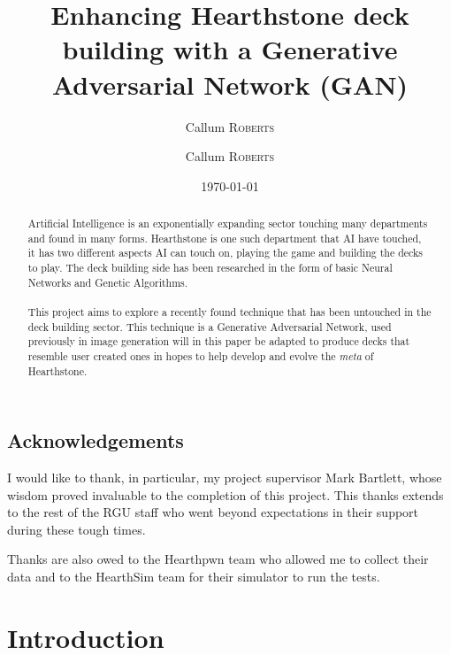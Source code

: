 \documentclass{report} %
\title{Enhancing Hearthstone deck building with a Generative Adversarial Network (GAN)} %
\author{Callum \textsc{Roberts}} %
\author{Callum \textsc{Roberts}} %
\date{\today} %
\begin{document}
\maketitle %


\begin{abstract}
Artificial Intelligence is an exponentially expanding sector touching many departments and found in many forms. Hearthstone is one such department that AI have touched, it has two different aspects AI can touch on, playing the game and building the decks to play. The deck building side has been researched in the form of basic Neural Networks and Genetic Algorithms. \\
\\
This project aims to explore a recently found technique that has been untouched in the deck building sector. This technique is a Generative Adversarial Network, used previously in image generation will in this paper be adapted to produce decks that resemble user created ones in hopes to help develop and evolve the \textit{meta} of Hearthstone.

\end{abstract}

\section*{Acknowledgements}
I would like to thank, in particular, my project supervisor Mark Bartlett, whose wisdom proved invaluable to the completion of this project. This thanks extends to the rest of the RGU staff who went beyond expectations in their support during these tough times.

Thanks are also owed to the Hearthpwn team who allowed me to collect their data and to the HearthSim team for their simulator to run the tests.


\tableofcontents

\chapter{Introduction}
\end{document}

